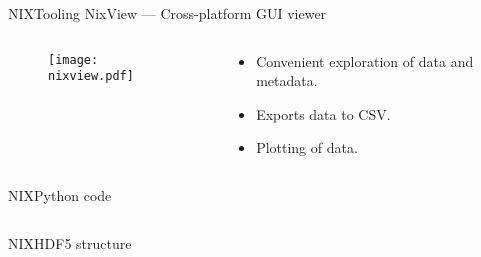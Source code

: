 \documentclass[10pt]{beamer}
\begin{document}
\begin{frame}{NIX}{Tooling}
    NixView --- Cross-platform GUI viewer

    \begin{columns}
        \begin{column}{0.5\textwidth}
            \begin{figure}
                \texttt{[image: nixview.pdf]}
            \end{figure}
        \end{column}
        \begin{column}{0.5\textwidth}
            \begin{itemize}
                \item Convenient exploration of data and metadata.
                \item Exports data to CSV.\
                \item Plotting of data.
            \end{itemize}
        \end{column}
    \end{columns}
\end{frame}

\begin{frame}[fragile]{NIX}{Python code}
    \inputminted[fontsize=\footnotesize]{python}{./code/nixify-data.py}
\end{frame}

\begin{frame}[fragile]{NIX}{HDF5 structure}
    \inputminted[fontsize=\footnotesize]{shell}{./code/h5ls.out}
\end{frame}
\end{document}
